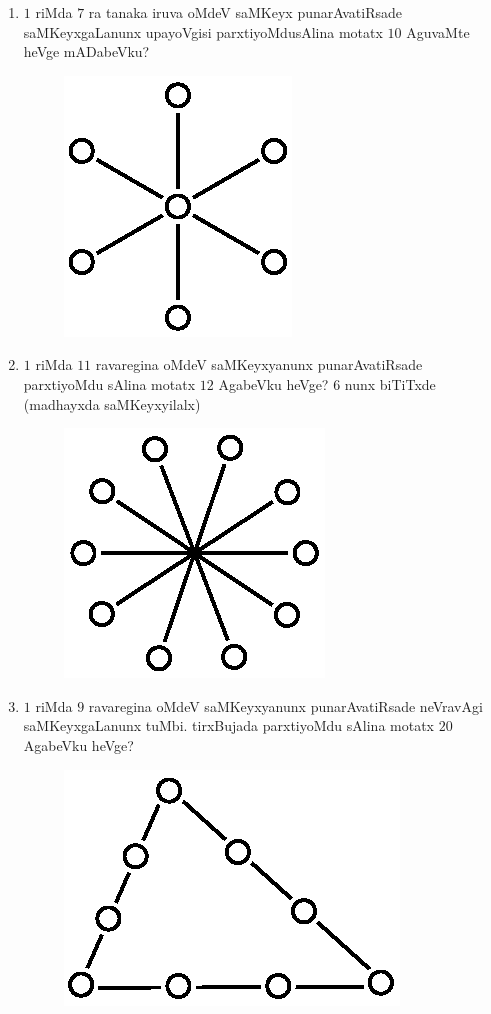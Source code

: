 \begin{enumerate}
\item $1$ riMda $7$ ra tanaka iruva oMdeV saMKeyx punarAvatiRsade saMKeyx\-gaLanunx upayoVgisi parxtiyoMdusAlina motatx $10$ AguvaMte heVge mADabeVku?
\begin{figure}[H]
\centering
\includegraphics{src/figures/exr19.eps}
\end{figure}

\item $1$ riMda $11$ ravaregina oMdeV saMKeyxyanunx punarAvatiRsade parxtiyoMdu sAlina motatx $12$ AgabeVku heVge? $6$ nunx biTiTxde (madhayxda saMKeyxyilalx)
\begin{figure}[H]
\centering
\includegraphics{src/figures/exr20.eps}
\end{figure}

\eject

\item $1$ riMda $9$ ravaregina oMdeV saMKeyxyanunx punarAvatiRsade neVravAgi saMKeyxgaLanunx tuMbi. tirxBujada parxtiyoMdu sAlina motatx $20$ AgabeVku heVge?
\begin{figure}[H]
\centering
\includegraphics{src/figures/exr21.eps}
\end{figure}




\end{enumerate}
